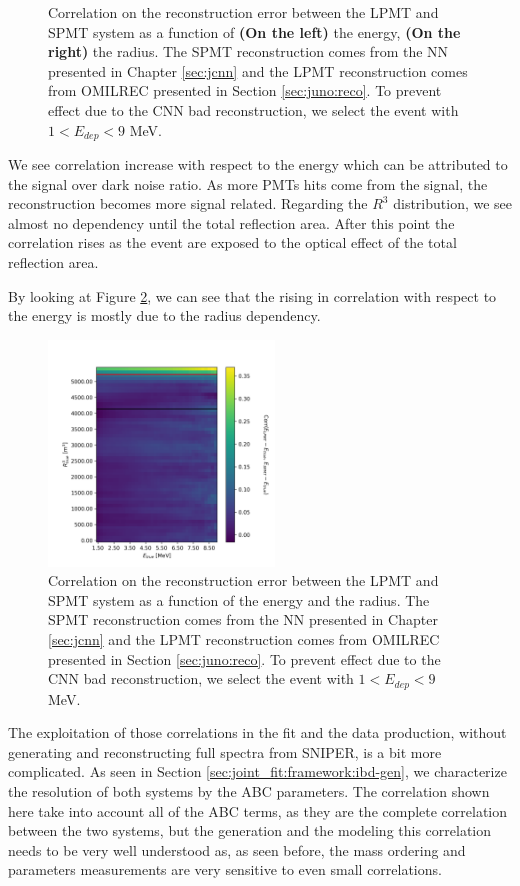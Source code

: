 \documentclass[../main.tex]{subfiles}
\begin{document}
\begin{figure}[ht]
\begin{subfigure}[t]{0.48\linewidth}
  \end{subfigure}
  \caption{Correlation on the reconstruction error between the LPMT and SPMT system as a function of \textbf{(On the left)} the energy, \textbf{(On the right)} the radius. The SPMT reconstruction comes from the NN presented in Chapter \ref{sec:jcnn} and the LPMT reconstruction comes from OMILREC presented in Section \ref{sec:juno:reco}. To prevent effect due to the CNN bad reconstruction, we select the event with $1 < E_{dep} < 9$ MeV.}
  \label{fig:joint_fit:empirical_corr:E_a_R}
\end{figure}

We see correlation increase with respect to the energy which can be attributed to the signal over dark noise ratio. As more PMTs hits come from the signal, the reconstruction becomes more signal related. Regarding the $R^3$ distribution, we see almost no dependency until the total reflection area. After this point the correlation rises as the event are exposed to the optical effect of the total reflection area.

By looking at Figure \ref{fig:joint_fit:empirical_corr:E_R}, we can see that the rising in correlation with respect to the energy is mostly due to the radius dependency.

\begin{figure}[ht]
  \centering
  \includegraphics[height=6cm]{images/joint_fit/E_R_corr.png}
  \caption{Correlation on the reconstruction error between the LPMT and SPMT system as a function of  the energy and the radius. The SPMT reconstruction comes from the NN presented in Chapter \ref{sec:jcnn} and the LPMT reconstruction comes from OMILREC presented in Section \ref{sec:juno:reco}. To prevent effect due to the CNN bad reconstruction, we select the event with $1 < E_{dep} < 9$ MeV.}
  \label{fig:joint_fit:empirical_corr:E_R}
\end{figure}

The exploitation of those correlations in the fit and the data production, without generating and reconstructing full spectra from SNIPER, is a bit more complicated. As seen in Section \ref{sec:joint_fit:framework:ibd-gen}, we characterize the resolution of both systems by the ABC parameters. The correlation shown here take into account all of the ABC terms, as they are the complete correlation between the two systems, but the generation and the modeling this correlation needs to be very well understood as, as seen before, the mass ordering and parameters measurements are very sensitive to even small correlations.
\end{document}
